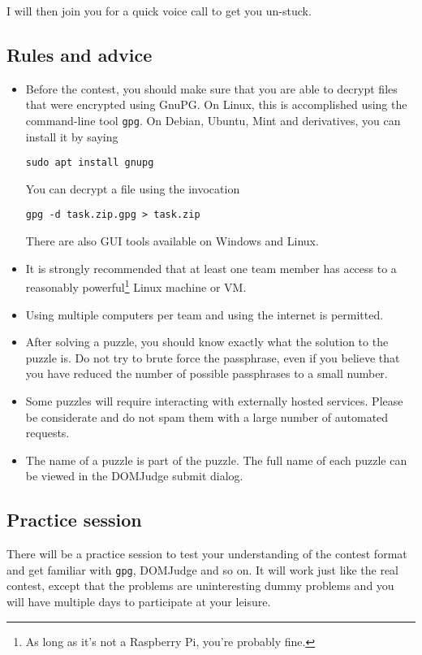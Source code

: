 \documentclass[fontsize=10pt,a4paper,DIV=12,parskip=half]{scrarticle}
\begin{document}
I will then join you for a quick voice call to get you un-stuck.

\subsection*{Rules and advice}
\begin{itemize}
	\item Before the contest, you should make sure that you are able to decrypt
		files that were encrypted using GnuPG. On Linux, this is accomplished
		using the command-line tool \texttt{gpg}. On Debian, Ubuntu, Mint and derivatives, you can
		install it by saying
		\begin{center}
			\texttt{sudo apt install gnupg}
		\end{center}
		You can decrypt a file using the invocation
		\begin{center}
			\texttt{gpg -d task.zip.gpg > task.zip}
		\end{center}
		There are also GUI tools available on Windows and Linux.
	\item It is strongly recommended that at least one team member has access
		to a reasonably powerful\footnote{As long as it's not a Raspberry Pi, you're probably fine.} Linux machine or VM.
	\item Using multiple computers per team and using the internet is permitted.
	\item After solving a puzzle, you should know exactly what the solution to
		the puzzle is. Do not try to brute force the passphrase, even if you
		believe that you have reduced the number of possible passphrases to a
		small number.
	\item Some puzzles will require interacting with externally hosted services.
		Please be considerate and do not spam them with a large number of automated
		requests.
	\item The name of a puzzle is part of the puzzle. The full name of each puzzle
		can be viewed in the DOMJudge submit dialog.
\end{itemize}

\subsection*{Practice session}
There will be a practice session to test your understanding of the contest format and
get familiar with \texttt{gpg}, DOMJudge and so on. It will work just like the real
contest, except that the problems are uninteresting dummy problems and you will have
multiple days to participate at your leisure.
\end{document}

